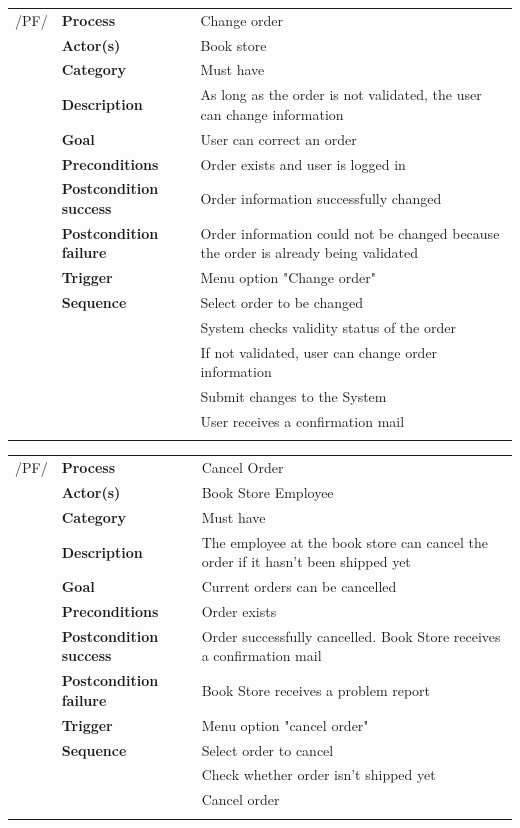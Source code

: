 \documentclass[11pt,a4paper,oneside,svgnames]{report}
\begin{document}
\noindent
\begin{tabular}{p{1.5cm}p{3cm}p{8cm}}
/PF/	& \textbf{Process} & Change order\\
		& \textbf{Actor(s)} & Book store\\
		& \textbf{Category} & Must have\\
		& \textbf{Description}	 & As long as the order is not validated, the user can change information\\
		& \textbf{Goal} & User can correct an order\\
		& \textbf{Preconditions} & Order exists and user is logged in\\
		& \textbf{Postcondition success} & Order information successfully changed\\
		& \textbf{Postcondition failure} & Order information could not be changed because the order is already being validated\\
		& \textbf{Trigger} & Menu option "Change order"\\
		& \textbf{Sequence} & Select order to be changed\\
		& & System checks validity status of the order\\
		& & If not validated, user can change order information\\
		& & Submit changes to the System\\
		& & User receives a confirmation mail\\
		
\hfill \\
\end{tabular}

\noindent
\begin{tabular}{p{1.5cm}p{3cm}p{8cm}}
/PF/	& \textbf{Process} & Cancel Order\\
		& \textbf{Actor(s)} & Book Store Employee\\
		& \textbf{Category} & Must have\\
		& \textbf{Description}	 & The employee at the book store can cancel the order if it hasn’t been shipped yet\\
		& \textbf{Goal} & Current orders can be cancelled\\
		& \textbf{Preconditions} & Order exists\\
		& \textbf{Postcondition success} & Order successfully cancelled. Book Store receives a confirmation mail\\
		& \textbf{Postcondition failure} & Book Store receives a problem report\\
		& \textbf{Trigger} & Menu option "cancel order"\\
		& \textbf{Sequence} & Select order to cancel\\
		& & Check whether order isn't shipped yet\\
		& & Cancel order\\
		
\hfill \\
\end{tabular}
\end{document}
